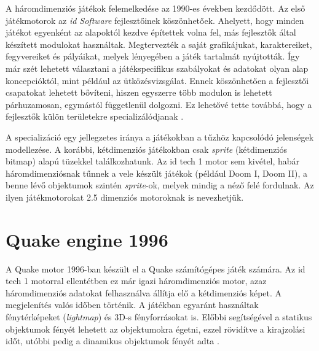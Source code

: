 
A háromdimenziós játékok felemelkedése az 1990-es években kezdődött. Az első játékmotorok az \textit{id Software} fejlesztőinek köszönhetőek. Ahelyett, hogy minden játékot egyenként az alapoktól kezdve építettek volna fel, más fejlesztők által készített modulokat használtak. Megtervezték a saját grafikájukat, karaktereiket, fegyvereiket és pályáikat, melyek lényegében a játék tartalmát nyújtották. Így már szét lehetett választani a játékspecifikus szabályokat és adatokat olyan alap koncepcióktól, mint például az ütközésvizsgálat. Ennek köszönhetően a fejlesztői csapatokat lehetett bővíteni, hiszen egyszerre több modulon is lehetett párhuzamosan, egymástól függetlenül dolgozni. Ez lehetővé tette továbbá, hogy a fejlesztők külön területekre specializálódjanak \cite{wikiGameEngine}.

A specializáció egy jellegzetes iránya a játékokban a tűzhöz kapcsolódó jelenségek modellezése. A korábbi, kétdimenziós játékokban csak \textit{sprite} (kétdimenziós bitmap) alapú tüzekkel találkozhatunk. Az id tech 1 motor sem kivétel, habár háromdimenziósnak tűnnek a vele készült játékok (például Doom I, Doom II), a benne lévő objektumok szintén \textit{sprite}-ok, melyek mindig a néző felé fordulnak. Az ilyen játékmotorokat 2.5 dimenziós motoroknak is nevezhetjük. 


\section{Quake engine 1996}


A Quake motor 1996-ban készült el a Quake számítógépes játék számára. Az id tech 1 motorral ellentétben ez már igazi háromdimenziós motor, azaz háromdimenziós adatokat felhasználva állítja elő a kétdimenziós képet. A megjelenítés valós időben történik. A játékban egyaránt használtak fénytérképeket (\textit{lightmap}) és 3D-s fényforrásokat is. Előbbi segítségével a statikus objektumok fényét lehetett az objektumokra égetni, ezzel rövidítve a kirajzolási időt, utóbbi pedig a dinamikus objektumok fényét adta \cite{wikiQuake}.

